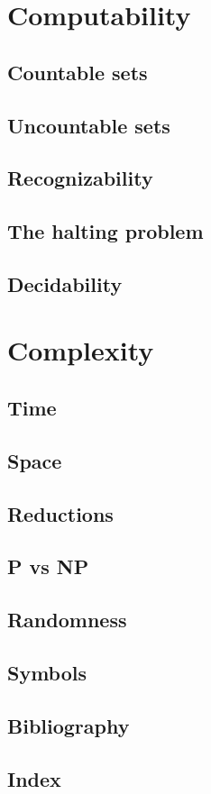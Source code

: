 \documentclass{book}
\begin{document}
\part{Computability} 

\chapter{Countable sets} 
\chapter{Uncountable sets} 
\chapter{Recognizability} 
\chapter{The halting problem} 
\chapter{Decidability} 

\part{Complexity} 

\chapter{Time} 
\chapter{Space} 
\chapter{Reductions} 
\chapter{P vs NP} 
\chapter{Randomness} 

\appendix
\chapter{Symbols} 

\backmatter

\chapter{Bibliography} 
\chapter{Index} 
\end{document}
